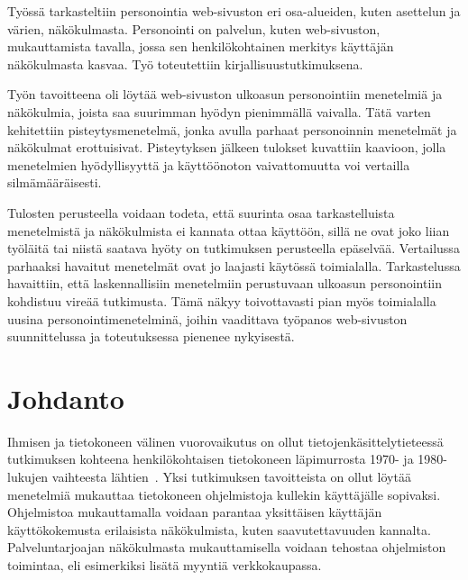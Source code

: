 \documentclass[finnish, 12pt, a4paper, elec, utf8, a-1b]{aaltothesis}
\date{29.4.2022}
\begin{document}
\makecoverpage{}

\makecopyrightpage{}

\begin{abstractpage}[finnish]
    Työssä tarkasteltiin personointia web-sivuston eri osa-alueiden, kuten
    asettelun ja värien, näkökulmasta. Personointi on palvelun, kuten
    web-sivuston, mukauttamista tavalla, jossa sen henkilökohtainen merkitys
    käyttäjän näkökulmasta kasvaa. Työ toteutettiin kirjallisuustutkimuksena.

    Työn tavoitteena oli löytää web-sivuston ulkoasun personointiin menetelmiä
    ja näkökulmia, joista saa suurimman hyödyn pienimmällä vaivalla. Tätä varten
    kehitettiin pisteytysmenetelmä, jonka avulla parhaat personoinnin menetelmät
    ja näkökulmat erottuisivat. Pisteytyksen jälkeen tulokset kuvattiin
    kaavioon, jolla menetelmien hyödyllisyyttä ja käyttöönoton vaivattomuutta
    voi vertailla silmämääräisesti.

    Tulosten perusteella voidaan todeta, että suurinta osaa tarkastelluista
    menetelmistä ja näkökulmista ei kannata ottaa käyttöön, sillä ne ovat joko
    liian työläitä tai niistä saatava hyöty on tutkimuksen perusteella
    epäselvää. Vertailussa parhaaksi havaitut menetelmät ovat jo laajasti
    käytössä toimialalla. Tarkastelussa havaittiin, että laskennallisiin
    menetelmiin perustuvaan ulkoasun personointiin kohdistuu vireää
    tutkimusta. Tämä näkyy toivottavasti pian myös toimialalla uusina
    personointimenetelminä, joihin vaadittava työpanos web-sivuston
    suunnittelussa ja toteutuksessa pienenee nykyisestä.
\end{abstractpage}

\thesistableofcontents{}

\cleardoublepage{}
\section{Johdanto}

Ihmisen ja tietokoneen välinen vuorovaikutus on ollut tietojenkäsittelytieteessä
tutkimuksen kohteena henkilökohtaisen tietokoneen läpimurrosta 1970- ja
1980-lukujen vaihteesta lähtien~\cite{10.1145/800178.810088}. Yksi tutkimuksen
tavoitteista on ollut löytää menetelmiä mukauttaa tietokoneen ohjelmistoja
kullekin käyttäjälle sopivaksi. Ohjelmistoa mukauttamalla voidaan parantaa
yksittäisen käyttäjän käyttökokemusta erilaisista näkökulmista, kuten
saavutettavuuden kannalta. Palveluntarjoajan näkökulmasta mukauttamisella
voidaan tehostaa ohjelmiston toimintaa, eli esimerkiksi lisätä myyntiä
verkkokaupassa.
\end{document}
